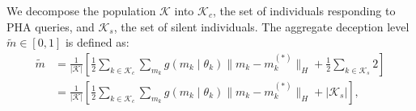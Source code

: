 \documentclass[sigconf,review]{acmart}
\DeclareMathOperator*{\argmax}{arg\,max}
\newcommand{\abs}[1]{\left| #1 \right|}
\begin{document}

We decompose the population $\mathcal{K}$ into $\mathcal{K}_c$, the set of individuals responding to PHA queries, and $\mathcal{K}_s$, the set of silent individuals. The aggregate deception level $\tilde m\in[0,1]$ is defined as:
\begin{equation}
\begin{aligned}
    \tilde{m} &= \frac{1}{|\mathcal K|}
\left[\frac{1}{2}\sum\limits_{k\in \mathcal{K}_c}\sum\limits_{m_k} g(m_k\mid \theta_k) \lVert m_k-m_k^{(\ast)} \rVert_H + \frac{1}{2}\sum\limits_{k\in \mathcal{K}_s} 2\right] \\ 
              &= \frac{1}{|\mathcal K|}
\left[\frac{1}{2}\sum\limits_{k\in \mathcal{K}_c}\sum\limits_{m_k} g(m_k\mid \theta_k) \lVert m_k-m_k^{(\ast)} \rVert_H + \abs{\mathcal{K}_s}\right],
\end{aligned}
\end{equation}
\end{document}
